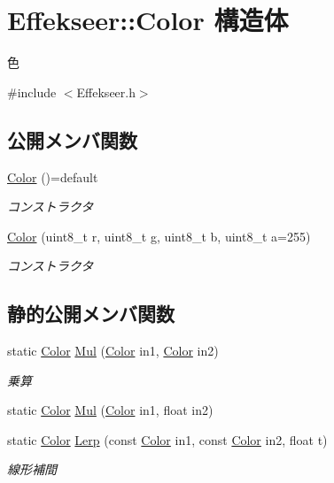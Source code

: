\hypertarget{struct_effekseer_1_1_color}{}\section{Effekseer\+:\+:Color 構造体}
\label{struct_effekseer_1_1_color}


色  




{\ttfamily \#include $<$Effekseer.\+h$>$}

\subsection*{公開メンバ関数}
\begin{DoxyCompactItemize}
\item 
\mbox{\hyperlink{struct_effekseer_1_1_color_add67be00fd9bb85ad4f3bb9f6a1b755f}{Color}} ()=default
\begin{DoxyCompactList}\small\item\em コンストラクタ \end{DoxyCompactList}\item 
\mbox{\hyperlink{struct_effekseer_1_1_color_ace968f910830ff624662b5371b559703}{Color}} (uint8\+\_\+t r, uint8\+\_\+t g, uint8\+\_\+t b, uint8\+\_\+t a=255)
\begin{DoxyCompactList}\small\item\em コンストラクタ \end{DoxyCompactList}\end{DoxyCompactItemize}
\subsection*{静的公開メンバ関数}
\begin{DoxyCompactItemize}
\item 
static \mbox{\hyperlink{struct_effekseer_1_1_color}{Color}} \mbox{\hyperlink{struct_effekseer_1_1_color_a58cd8ceb0f235e9d1251be18ef208ead}{Mul}} (\mbox{\hyperlink{struct_effekseer_1_1_color}{Color}} in1, \mbox{\hyperlink{struct_effekseer_1_1_color}{Color}} in2)
\begin{DoxyCompactList}\small\item\em 乗算 \end{DoxyCompactList}\item 
static \mbox{\hyperlink{struct_effekseer_1_1_color}{Color}} \mbox{\hyperlink{struct_effekseer_1_1_color_a350c4dc2e0b0c35207c53fcc047376c3}{Mul}} (\mbox{\hyperlink{struct_effekseer_1_1_color}{Color}} in1, float in2)
\item 
static \mbox{\hyperlink{struct_effekseer_1_1_color}{Color}} \mbox{\hyperlink{struct_effekseer_1_1_color_a7dba2d9c1af67782f60f5968c8bcb32d}{Lerp}} (const \mbox{\hyperlink{struct_effekseer_1_1_color}{Color}} in1, const \mbox{\hyperlink{struct_effekseer_1_1_color}{Color}} in2, float t)
\begin{DoxyCompactList}\small\item\em 線形補間 \end{DoxyCompactList}\end{DoxyCompactItemize}
